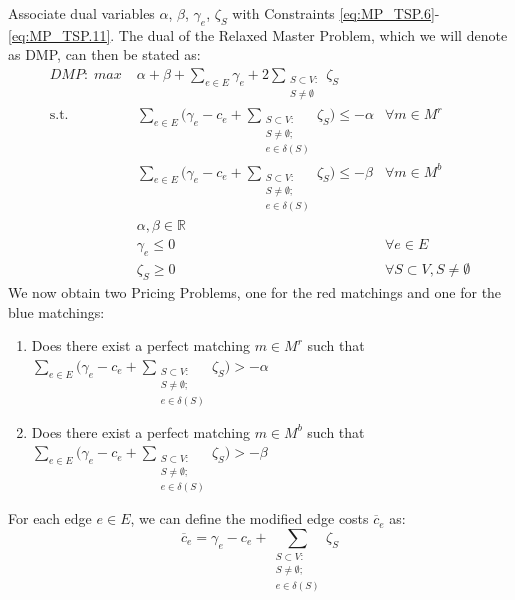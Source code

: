 \documentclass[a4paper]{article}
\begin{document}
Associate dual variables $\alpha$, $\beta$, $\gamma_e$, $\zeta_S$ with Constraints \eqref{eq:MP_TSP.6}-\eqref{eq:MP_TSP.11}. The dual of the Relaxed Master Problem, which we will denote as DMP, can then be stated as:\\
\begin{align}
\label{eq:DMP_TSP.0} \mathit{DMP:}\; max\; &\alpha+\beta+\sum_{e\in E}\gamma_e +2\sum_{\substack{S \subset V:\\S\neq \emptyset}}\zeta_S &\\
\label{eq:DMP_TSP.1} \mbox{s.t. }&\sum_{e\in E}\Big(\gamma_e-c_e+\sum_{\substack{S \subset V:\\S\neq \emptyset;\\e\in \delta(S)}}\zeta_S \Big)\leq -\alpha& \forall m\in M^r\\
\label{eq:DMP_TSP.2} &\sum_{e\in E}\Big(\gamma_e-c_e+\sum_{\substack{S \subset V:\\S\neq \emptyset;\\e\in \delta(S)}}\zeta_S \Big)\leq -\beta& \forall m\in M^b\\
\label{eq:DMP_TSP.3} &\alpha, \beta \in \mathbb{R} & \\
\label{eq:DMP_TSP.4} &\gamma_e\leq 0 & \forall e\in E\\
\label{eq:DMP_TSP.5} &\zeta_S\geq 0 & \forall S\subset V, S\neq \emptyset
\end{align}
We now obtain two Pricing Problems, one for the red matchings and one for the blue matchings:
\begin{enumerate}
 \item Does there exist a perfect matching $m\in M^r$ such that $\sum_{e\in E}\Big(\gamma_e-c_e+\sum_{\substack{S \subset V:\\S\neq \emptyset;\\e\in \delta(S)}}\zeta_S \Big)> -\alpha$
 \item Does there exist a perfect matching $m\in M^b$ such that $\sum_{e\in E}\Big(\gamma_e-c_e+\sum_{\substack{S \subset V:\\S\neq \emptyset;\\e\in \delta(S)}}\zeta_S \Big)> -\beta$
\end{enumerate}
For each edge $e\in E$, we can define the modified edge costs $\overline{c}_e$ as:
\begin{equation}
 \overline{c}_e=\gamma_e-c_e+\sum_{\substack{S \subset V:\\S\neq \emptyset;\\e\in \delta(S)}}\zeta_S
 \label{eq:modifiedEdgeCost}
\end{equation}
\end{document}
